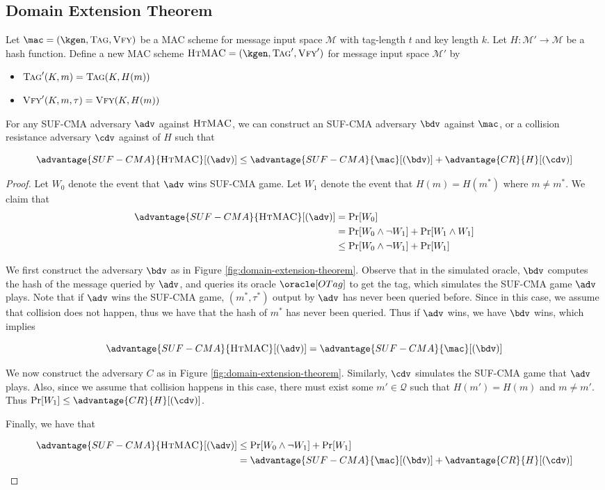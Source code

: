 \documentclass[11pt,a4paper]{article}
\renewcommand{\verify}{\textsc{Vfy}}
\newcommand{\Tag}{\textsc{Tag}}
\begin{document}
\subsection{Domain Extension Theorem} 
Let $\mac = (\kgen, \Tag, \verify)$ be a MAC scheme for message input space $\mathcal{M}$ with tag-length $t$ and key length $k$. Let $H: \mathcal{M}' \rightarrow \mathcal{M}$ be a hash function. Define a new MAC scheme $\textsc{HtMAC} = (\kgen, \Tag', \verify')$ for message input space $\mathcal{M}'$ by 
\begin{itemize}
\item $\Tag'(K, m) = \Tag(K, H(m))$
\item $\verify'(K, m, \tau) = \verify(K, H(m))$
\end{itemize}
For any SUF-CMA adversary $\adv$ against $\textsc{HtMAC}$, we can construct an SUF-CMA adversary $\bdv$ against $\mac$, or a collision resistance adversary $\cdv$ against of $H$ such that 

$$
\advantage{SUF-CMA}{\textsc{HtMAC}}[(\adv)] \leq \advantage{SUF-CMA}{\mac}[(\bdv)] + \advantage{CR}{H}[(\cdv)] 
$$


\begin{proof}
Let $W_0$ denote the event that $\adv$ wins SUF-CMA game. Let $W_1$ denote the event that $H(m) = H(m^*)$ where $m \neq m^*$. We claim that 
$$
\begin{aligned}
\advantage{SUF-CMA}{\textsc{HtMAC}}[(\adv)] &= \Pr[W_0] \\ 
&= \Pr[W_0 \wedge \neg W_1] + \Pr[W_1 \wedge W_1] \\ 
&\leq \Pr[W_0 \wedge \neg W_1] + \Pr[W_1] 
\end{aligned}
$$

We first construct the adversary $\bdv$ as in Figure \ref{fig:domain-extension-theorem}. Observe that in the simulated oracle, $\bdv$ computes  the hash of the message queried by $\adv$, and queries its oracle $\oracle[OTag]$ to get the tag, which simulates the SUF-CMA game $\adv$ plays. Note that if $\adv$ wins the SUF-CMA game, $(m^*, \tau^*)$ output by $\adv$ has never been queried before. Since in this case, we assume that collision does not happen, thus we have that the hash of $m^*$ has never been queried. Thus if $\adv$ wins, we have $\bdv$ wins, which implies 

$$
\advantage{SUF-CMA}{\textsc{HtMAC}}[(\adv)] = \advantage{SUF-CMA}{\mac}[(\bdv)] 
$$

We now construct the adversary $C$ as in Figure \ref{fig:domain-extension-theorem}. Similarly, $\cdv$ simulates the SUF-CMA game that $\adv$ plays. Also, since we assume that collision happens in this case, there must exist some $m' \in \mathcal{Q}$ such that $H(m') = H(m)$ and $m \neq m'$. Thus $\Pr[W_1] \leq \advantage{CR}{H}[(\cdv)]$. 

Finally, we have that 

$$
\begin{aligned}
\advantage{SUF-CMA}{\textsc{HtMAC}}[(\adv)] 
&\leq \Pr[W_0 \wedge \neg W_1] + \Pr[W_1] \\
&=  \advantage{SUF-CMA}{\mac}[(\bdv)]  + \advantage{CR}{H}[(\cdv)]
\end{aligned}
$$

\end{proof}
\end{document}
